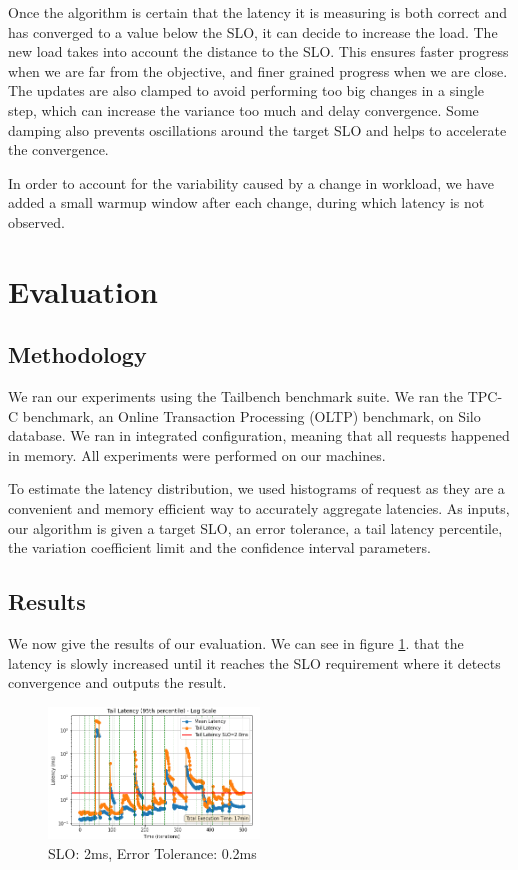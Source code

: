 \documentclass[10pt,conference,compsocconf]{IEEEtran}
\begin{document}
Once the algorithm is certain that the latency it is measuring is both correct and has converged to a value below the SLO, it can decide to increase the load. The new load takes into account the distance to the SLO. This ensures faster progress when we are far from the objective, and finer grained progress when we are close. The updates are also clamped to avoid performing too big changes in a single step, which can increase the variance too much and delay convergence. Some damping also prevents oscillations around the target SLO and helps to accelerate the convergence. 

In order to account for the variability caused by a change in workload, we have added a small warmup window after each change, during which latency is not observed.

\section{Evaluation} \label{eval}

\subsection{Methodology}

We ran our experiments using the Tailbench benchmark suite. We ran the TPC-C benchmark, an Online Transaction Processing (OLTP) benchmark, on Silo database. We ran in integrated configuration, meaning that all requests happened in memory. All experiments were performed on our machines.

To estimate the latency distribution, we used histograms of request as they are a convenient and memory efficient way to accurately aggregate latencies. As inputs, our algorithm is given a target SLO, an error tolerance, a tail latency percentile, the variation coefficient limit and the confidence interval parameters.

\subsection{Results}

We now give the results of our evaluation. We can see in figure \ref{fig:res1}. that the latency is slowly increased until it reaches the SLO requirement where it detects convergence and outputs the result.

\begin{figure}[H]
	\centering
	\includegraphics[width=0.5\textwidth]{result1.png}
	\vspace{-1em}
	\caption{SLO: 2ms, Error Tolerance: 0.2ms}
	\label{fig:res1}
\end{figure}
\end{document}
